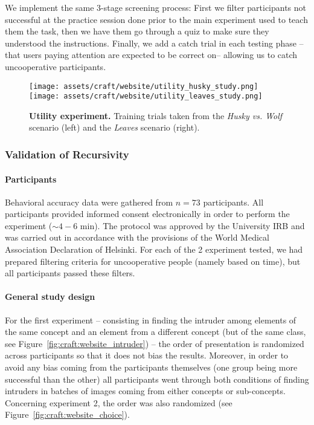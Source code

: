 We implement the same 3-stage screening process: First we filter participants not successful at the practice session done prior to the main experiment used to teach them the task, then we have them go through a quiz to make sure they understood the instructions. Finally, we add a catch trial in each testing phase --that users paying attention are expected to be correct on-- allowing us to catch uncooperative participants.

\begin{figure*}[hb]
    \centering
    \begin{subfigure}{0.9\textwidth}
        \centering
        \texttt{[image: assets/craft/website/utility\_husky\_study.png]}
        \texttt{[image: assets/craft/website/utility\_leaves\_study.png]}
        \caption{\textbf{Utility experiment.} Training trials taken from the \textit{Husky vs. Wolf} scenario (left) and the \textit{Leaves} scenario (right).}
        \label{fig:craft:website_utility}
    \end{subfigure}
\end{figure*}


\subsubsection{Validation of Recursivity}

\paragraph{Participants} Behavioral accuracy data were gathered from $n=73$ participants. All participants provided informed consent electronically in order to perform the experiment ($\sim 4 - 6$ min). The protocol was approved by the University IRB and was carried out in accordance with the provisions of the World Medical Association Declaration of Helsinki. 
For each of the 2 experiment tested, we had prepared filtering criteria for uncooperative people (namely based on time), but all participants passed these filters.

\paragraph{General study design}

For the first experiment -- consisting in finding the intruder among elements of the same concept and an element from a different concept (but of the same class, see Figure~\ref{fig:craft:website_intruder}) -- the order of presentation is randomized across participants so that it does not bias the results.
Moreover, in order to avoid any bias coming from the participants themselves (one group being more successful than the other) all participants went through both conditions of finding intruders in batches of images coming from either concepts or sub-concepts.
Concerning experiment 2, the order was also randomized (see Figure~\ref{fig:craft:website_choice}).


